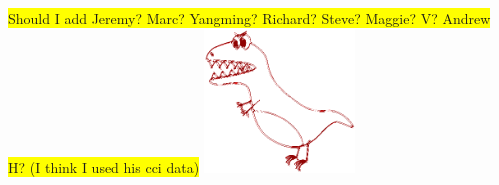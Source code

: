\documentclass[bg, manuscript]{copernicus}
\newcommand{\hilight}[1]{\colorbox{yellow}{#1}}
\begin{document}



\received{}
\pubdiscuss{} %
\revised{}
\accepted{}
\published{}




\maketitle

\hilight{Should I add Jeremy? Marc? Yangming? Richard? Steve? Maggie? V? Andrew H? (I think I used his cci data)}
\includegraphics[width=4cm]{figs/dino.png}
\end{document}
